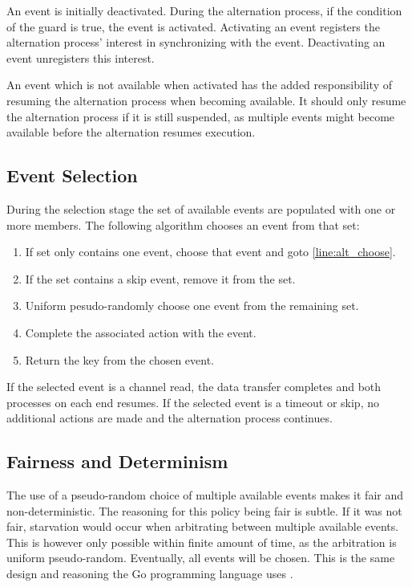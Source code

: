An event is initially deactivated. During the alternation process, if the condition of the guard is true, the event is activated. Activating an event registers the alternation process' interest in synchronizing with the event. Deactivating an event unregisters this interest. 

An event which is not available when activated has the added responsibility of resuming the alternation process when becoming available. It should only resume the alternation process if it is still suspended, as multiple events might become available before the alternation resumes execution.

\subsection{Event Selection}
\label{subsec:event_selection}

During the selection stage the set of available events are populated with one or more members. The following algorithm chooses an event from that set:

\begin{enumerate}[topsep=0em,itemsep=-1em,partopsep=0.5em,parsep=1em]
    \item If set only contains one event, choose that event and goto \ref{line:alt_choose}.
    \item If the set contains a skip event, remove it from the set.
    \item Uniform pesudo\hyp{}randomly choose one event from the remaining set. 
    \item Complete the associated action with the event. \label{line:alt_choose}
    \item Return the key from the chosen event.
\end{enumerate}

If the selected event is a channel read, the data transfer completes and both processes on each end resumes. If the selected event is a timeout or skip, no additional actions are made and the alternation process continues. 

\subsection{Fairness and Determinism}
\label{subsec:alternation_fairness}

The use of a pseudo\hyp{}random choice of multiple available events makes it fair and non\hyp{}deterministic. The reasoning for this policy being fair is subtle. If it was not fair, starvation would occur when arbitrating between multiple available events. This is however only possible within finite amount of time, as the arbitration is uniform pseudo\hyp{}random. Eventually, all events will be chosen. This is the same design and reasoning the Go programming language uses \citep[see][Select statements]{golangspec}.

